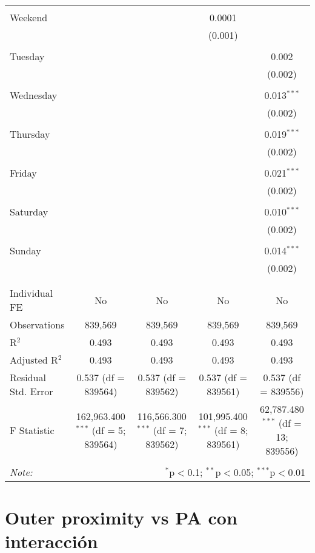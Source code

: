 \documentclass[
]{article}
\begin{document}
\begin{table}[!htbp]
{\begin{tabular}{@{\extracolsep{5pt}}lcccc}
  & & & & \\ 
 Weekend &  &  & 0.0001 &  \\ 
  &  &  & (0.001) &  \\ 
  & & & & \\ 
 Tuesday &  &  &  & 0.002 \\ 
  &  &  &  & (0.002) \\ 
  & & & & \\ 
 Wednesday &  &  &  & 0.013$^{***}$ \\ 
  &  &  &  & (0.002) \\ 
  & & & & \\ 
 Thursday &  &  &  & 0.019$^{***}$ \\ 
  &  &  &  & (0.002) \\ 
  & & & & \\ 
 Friday &  &  &  & 0.021$^{***}$ \\ 
  &  &  &  & (0.002) \\ 
  & & & & \\ 
 Saturday &  &  &  & 0.010$^{***}$ \\ 
  &  &  &  & (0.002) \\ 
  & & & & \\ 
 Sunday &  &  &  & 0.014$^{***}$ \\ 
  &  &  &  & (0.002) \\ 
  & & & & \\ 
\hline \\[-1.8ex] 
Individual FE & No & No & No & No \\ 
Observations & 839,569 & 839,569 & 839,569 & 839,569 \\ 
R$^{2}$ & 0.493 & 0.493 & 0.493 & 0.493 \\ 
Adjusted R$^{2}$ & 0.493 & 0.493 & 0.493 & 0.493 \\ 
Residual Std. Error & 0.537 (df = 839564) & 0.537 (df = 839562) & 0.537 (df = 839561) & 0.537 (df = 839556) \\ 
F Statistic & 162,963.400$^{***}$ (df = 5; 839564) & 116,566.300$^{***}$ (df = 7; 839562) & 101,995.400$^{***}$ (df = 8; 839561) & 62,787.480$^{***}$ (df = 13; 839556) \\ 
\hline 
\hline \\[-1.8ex] 
\textit{Note:}  & \multicolumn{4}{r}{$^{*}$p$<$0.1; $^{**}$p$<$0.05; $^{***}$p$<$0.01} \\ 
\end{tabular}
} 
\end{table} 
\newpage
\section{Outer proximity vs PA con interacción}
\end{document}
